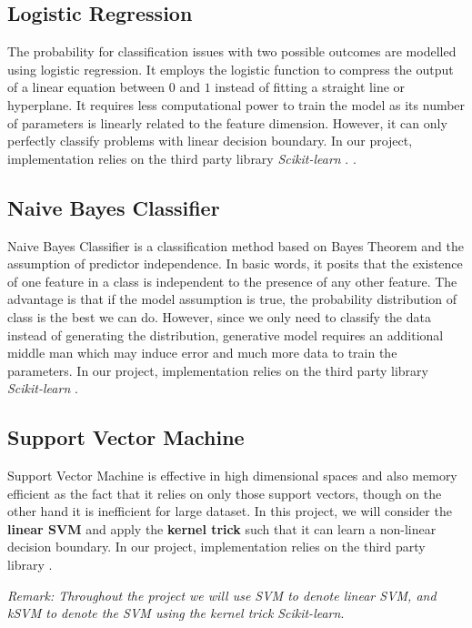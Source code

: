\documentclass{article}
\begin{document}
\subsection{Logistic Regression}
The probability for classification issues with two possible outcomes are modelled using logistic regression. It employs the logistic function to compress the output of a linear equation between $0$ and $1$ instead of fitting a straight line or hyperplane. It requires less computational power to train the model as its number of parameters is linearly related to the feature dimension. However, it can only perfectly classify problems with linear decision boundary. In our project, implementation relies on the third party library \emph{Scikit-learn} \cite{pedregosa2011scikit}. \cite{pedregosa2011scikit}.

\subsection{Naive Bayes Classifier}
Naive Bayes Classifier is a classification method based on Bayes Theorem and the assumption of predictor independence. In basic words, it posits that the existence of one feature in a class is independent to the presence of any other feature. The advantage is that if the model assumption is true, the probability distribution of class is the best we can do. However, since we only need to classify the data instead of generating the distribution, generative model requires an additional middle man which may induce error and much more data to train the parameters. In our project, implementation relies on the third party library \emph{Scikit-learn} \cite{pedregosa2011scikit}.

\subsection{Support Vector Machine}
Support Vector Machine is effective in high dimensional spaces and also memory efficient as the fact that it relies on only those support vectors, though on the other hand it is inefficient for large dataset. In this project, we will consider the \textbf{linear SVM} and apply the \textbf{kernel trick} such that it can learn a non-linear decision boundary. In our project, implementation relies on the third party library \cite{pedregosa2011scikit}.

\emph{Remark: Throughout the project we will use SVM to denote linear SVM, and kSVM to denote the SVM using the kernel trick}
\emph{Scikit-learn}.
\end{document}

